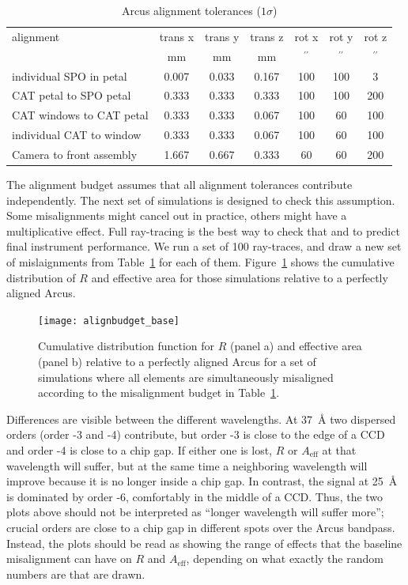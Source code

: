 \documentclass[12pt]{spieman}  %
\begin{document}
\begin{spacing}{2}
\begin{table}
    \caption{Arcus alignment tolerances ($1\sigma$)\label{tab:tolerances}}
    \centering
    \begin{tabular}{l|cccccc}
        \hline\hline
    alignment & trans x & trans y & trans z & rot x & rot y & rot z \\
     & $\mathrm{mm}$ & $\mathrm{mm}$ & $\mathrm{mm}$ & $\mathrm{{}^{\prime\prime}}$ & $\mathrm{{}^{\prime\prime}}$ & $\mathrm{{}^{\prime\prime}}$ \\
     \hline
    individual SPO in petal & 0.007 & 0.033 & 0.167 & 100 & 100 & 3 \\
    CAT petal to SPO petal & 0.333 & 0.333 & 0.333 & 100 & 100 & 200 \\
    CAT windows to CAT petal & 0.333 & 0.333 & 0.067 & 100 & 60 & 100 \\
    individual CAT to window & 0.333 & 0.333 & 0.067 & 100 & 60 & 100 \\
    Camera to front assembly & 1.667 & 0.667 & 0.333 & 60 & 60 & 200 \\
    \end{tabular}
\end{table}

The alignment budget assumes that all alignment tolerances contribute independently. The next set of simulations is designed to check this assumption. Some misalignments might cancel out in practice, others might have a multiplicative effect. Full ray-tracing is the best way to check that and to predict final instrument performance. We run a set of 100 ray-traces, and draw a new set of mislaignments from Table~\ref{tab:tolerances} for each of them. Figure~\ref{fig:alignment_budget} shows the cumulative distribution of $R$ and effective area for those simulations relative to a perfectly aligned Arcus.

\begin{figure}
    \centering
    \texttt{[image: alignbudget\_base]}
    \caption {\label{fig:alignment_budget}
    Cumulative distribution function for $R$ (panel a) and effective area (panel b) relative to a perfectly aligned Arcus for a set of simulations where all elements are simultaneously misaligned according to the misalignment budget in Table~\ref{tab:tolerances}.}
\end{figure}


Differences are visible between the different wavelengths. At 37~\AA{} two dispersed orders (order -3 and -4) contribute, but order -3 is close to the edge of a CCD and order -4 is close to a chip gap. If either one is lost, $R$ or $A_\mathrm{eff}$ at that wavelength will suffer, but at the same time a neighboring wavelength will improve because it is no longer inside a chip gap. In contrast, the signal at 25~\AA{} is dominated by order -6, comfortably in the middle of a CCD. Thus, the two plots above should not be interpreted as ``longer wavelength will suffer more''; crucial orders are close to a chip gap in different spots over the Arcus bandpass. Instead, the plots should be read as showing the range of effects that the baseline misalignment can have on $R$ and $A_\mathrm{eff}$, depending on what exactly the random numbers are that are drawn.


\end{spacing}
\end{document}
